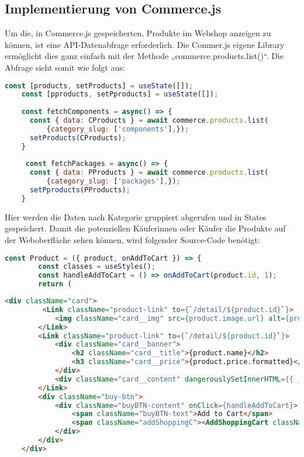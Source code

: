 \subsection{Implementierung von Commerce.js}

Um die, in Commerce.js gespeicherten, Produkte im Webshop anzeigen zu können, ist eine API-Datenabfrage erforderlich. Die Commer.js eigene Library ermöglicht dies ganz einfach mit der Methode „commerce.products.list()“. Die Abfrage sieht somit wie folgt aus: 
\newpage

\begin{lstlisting}[language=JavaScript, caption=Abfrage der Produkte, label=lst:impl:commerce]
    const [products, setProducts] = useState([]);
    const [pproducts, setPproducts] = useState([]);
    
    const fetchComponents = async() => {
      const { data: CProducts } = await commerce.products.list(
          {category_slug: ['components'],});
      setProducts(CProducts);
    }
  
     const fetchPackages = async() => {
      const { data: PProducts } = await commerce.products.list(
          {category_slug: ['packages'],});
      setPproducts(PProducts);
    }
\end{lstlisting}

Hier werden die Daten nach Kategorie gruppiert abgerufen und in States gespeichert. Damit die potenziellen Käuferinnen oder Käufer die Produkte auf der Weboberfläche sehen können, wird folgender Source-Code benötigt: \\
\begin{lstlisting}[language=JavaScript, caption={components.js}]
    const Product = ({ product, onAddToCart }) => {
        const classes = useStyles();
        const handleAddToCart = () => onAddToCart(product.id, 1);
        return (
\end{lstlisting}


\begin{lstlisting}[language=HTML, caption={components.html}]
    <div className="card">
         <Link className="product-link" to={`/detail/${product.id}`}>
            <img className="card__img" src={product.image.url} alt={product.name} />
        </Link>
        <Link className="product-link" to={`/detail/${product.id}`}>
            <div className="card__banner">
                <h2 className="card__title">{product.name}</h2>
                <h3 className="card__price">{product.price.formatted}</h3>
            </div>
            <div className="card__content" dangerouslySetInnerHTML={{ __html: product.description }} />
        </Link>
        <div className="buy-btn">
            <div className="buyBTN-content" onClick={handleAddToCart}>
                <span className="buyBTN-text">Add to Cart</span>
                <span className="addShoppingC"><AddShoppingCart className={classes.ascIcon} /></span>
            </div>
        </div>
    </div>
\end{lstlisting}

